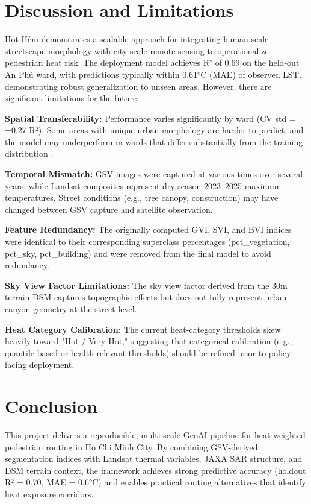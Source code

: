 \documentclass[
]{article}
\begin{document}
\section{Discussion and Limitations}
\label{sec:discussion}

Hot Hẻm demonstrates a scalable approach for integrating human-scale streetscape morphology with city-scale remote sensing to operationalize pedestrian heat risk. The deployment model achieves R² of 0.69 on the held-out An Phú ward, with predictions typically within 0.61°C (MAE) of observed LST, demonstrating robust generalization to unseen areas. However, there are significant limitations for the future:

\textbf{Spatial Transferability:} Performance varies significantly by ward (CV std = ±0.27 R²). Some areas with unique urban morphology are harder to predict, and the model may underperform in wards that differ substantially from the training distribution \citep{middel2019}.

\textbf{Temporal Mismatch:} GSV images were captured at various times over several years, while Landsat composites represent dry-season 2023--2025 maximum temperatures. Street conditions (e.g., tree canopy, construction) may have changed between GSV capture and satellite observation.

\textbf{Feature Redundancy:} The originally computed GVI, SVI, and BVI indices were identical to their corresponding superclass percentages (pct\_vegetation, pct\_sky, pct\_building) and were removed from the final model to avoid redundancy.

\textbf{Sky View Factor Limitations:} The sky view factor derived from the 30m terrain DSM captures topographic effects but does not fully represent urban canyon geometry at the street level.

\textbf{Heat Category Calibration:} The current heat-category thresholds skew heavily toward "Hot / Very Hot," suggesting that categorical calibration (e.g., quantile-based or health-relevant thresholds) should be refined prior to policy-facing deployment.

\section{Conclusion}
\label{sec:conclusion}

This project delivers a reproducible, multi-scale GeoAI pipeline for heat-weighted pedestrian routing in Ho Chi Minh City. By combining GSV-derived segmentation indices with Landsat thermal variables, JAXA SAR structure, and DSM terrain context, the framework achieves strong predictive accuracy (holdout R² = 0.70, MAE = 0.6°C) and enables practical routing alternatives that identify heat exposure corridors.
\end{document}
